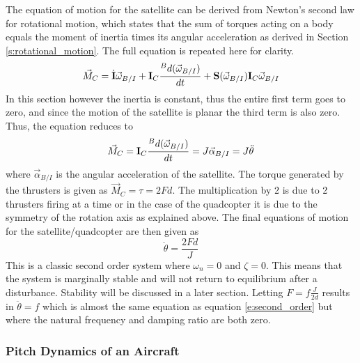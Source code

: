 The equation of motion for the satellite can be derived from Newton's second law for rotational motion, which states that the sum of torques acting on a body equals the moment of inertia times its angular acceleration as derived in Section \ref{s:rotational_motion}. The full equation is repeated here for clarity.
\begin{equation}
\vec{M}_C = \dot{{\bf I}}\vec{\omega}_{B/I} + {\bf I}_C\frac{{}^Bd (\vec{\omega}_{B/I})}{dt} + {\bf
  S}(\vec{\omega}_{B/I}){\bf I}_C\vec{\omega}_{B/I}
\end{equation}
In this section however the inertia is constant, thus the entire first term goes to zero, and since the motion of the satellite is planar the third term is also zero. Thus, the equation reduces to
\begin{equation}
\vec{M}_C = {\bf I}_C\frac{{}^Bd (\vec{\omega}_{B/I})}{dt} = J \vec{\alpha}_{B/I} = J\ddot{\theta}
\end{equation}
where $\vec{\alpha}_{B/I}$ is the angular acceleration of the satellite. The torque generated by the thrusters is given as $\vec{M}_C = \tau = 2Fd$. The multiplication by 2 is due to 2 thrusters firing at a time or in the case of the quadcopter it is due to the symmetry of the rotation axis as explained above. The final equations of motion for the satellite/quadcopter are then given as
\begin{equation}
\ddot{\theta} = \frac{2Fd}{J}
\end{equation}
This is a classic second order system where $\omega_n = 0$ and $\zeta = 0$. This means that the system is marginally stable and will not return to equilibrium after a disturbance. Stability will be discussed in a later section. Letting $F=f\frac{J}{2d}$ results in $\ddot{\theta}=f$ which is almost the same equation as equation \ref{e:second_order} but where the natural frequency and damping ratio are both zero. 

\subsubsection{Pitch Dynamics of an Aircraft}

